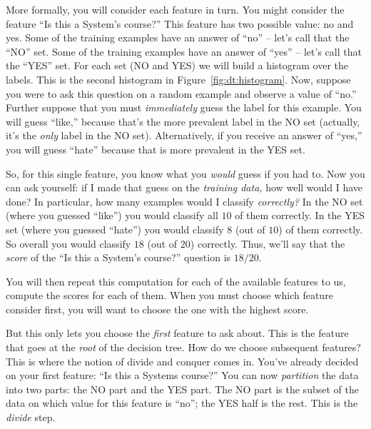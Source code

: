 More formally, you will consider each feature in turn.  You might
consider the feature ``Is this a System's course?''  This feature has
two possible value: no and yes.  Some of the training examples have an
answer of ``no'' -- let's call that the ``NO'' set.  Some of the
training examples have an answer of ``yes'' -- let's call that the
``YES'' set.  For each set (NO and YES) we will build a histogram over
the labels.  This is the second histogram in
Figure~\ref{fig:dt:histogram}.  Now, suppose you were to ask this
question on a random example and observe a value of ``no.''  Further
suppose that you must \emph{immediately} guess the label for this
example.  You will guess ``like,'' because that's the more prevalent
label in the NO set (actually, it's the \emph{only} label in the NO
set).  Alternatively, if you receive an answer of ``yes,'' you will
guess ``hate'' because that is more prevalent in the YES set.

So, for this single feature, you know what you \emph{would} guess if
you had to.  Now you can ask yourself: if I made that guess on the
\emph{training data,} how well would I have done?  In particular, how
many examples would I classify \emph{correctly?}  In the NO set (where
you guessed ``like'') you would classify all $10$ of them correctly.
In the YES set (where you guessed ``hate'') you would classify $8$
(out of $10$) of them correctly.  So overall you would classify $18$
(out of $20$) correctly.  Thus, we'll say that the \emph{score} of the
``Is this a System's course?'' question is $18/20$.


You will then repeat this computation for each of the available
features to us, compute the scores for each of them.  When you must
choose which feature consider first, you will want to choose the one
with the highest score.

But this only lets you choose the \emph{first} feature to ask about.
This is the feature that goes at the \emph{root} of the decision tree.
How do we choose subsequent features?  This is where the notion of
divide and conquer comes in.  You've already decided on your first
feature: ``Is this a Systems course?''  You can now \emph{partition}
the data into two parts: the NO part and the YES part.  The NO part is
the subset of the data on which value for this feature is ``no''; the
YES half is the rest.  This is the \emph{divide} step.

